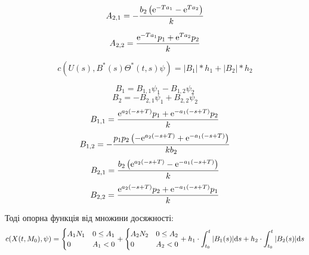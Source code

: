 \documentclass{article}
\begin{document}
\begin{equation}
A_{{2,1}}=-{\frac {b_{{2}} \left( {{\rm e}^{-Ta_{{1}}}}-{{\rm e}^{Ta_{
{2}}}} \right) }{k}}
\end{equation}

\begin{equation}
A_{{2,2}}={\frac {{{\rm e}^{-Ta_{{1}}}}p_{{1}}+{{\rm e}^{Ta_{{2}}}}p_{
{2}}}{k}}
\end{equation}

\begin{equation}
c( U(s), B^*(s) \Theta^* (t, s) \psi)=|B_1|*h_1+|B_2|*h_2
\end{equation}

\begin{equation}
B_{{1}}=B_{{1,1}}\psi_{{1}}-B_{{1,2}}\psi_{{2}}
\end{equation}
\begin{equation}
B_{{2}}=-B_{{2,1}}\psi_{{1}}+B_{{2,2}}\psi_{{2}}
\end{equation}
\begin{equation}
B_{{1,1}}={\frac {{{\rm e}^{a_{{2}} \left( -s+T \right) }}p_{{1}}+{
{\rm e}^{-a_{{1}} \left( -s+T \right) }}p_{{2}}}{k}}
\end{equation}
\begin{equation}
B_{{1,2}}=-{\frac {p_{{1}}p_{{2}} \left( -{{\rm e}^{a_{{2}} \left( -s+
T \right) }}+{{\rm e}^{-a_{{1}} \left( -s+T \right) }} \right) }{kb_{{
2}}}}
\end{equation}
\begin{equation}
B_{{2,1}}={\frac {b_{{2}} \left( {{\rm e}^{a_{{2}} \left( -s+T
 \right) }}-{{\rm e}^{-a_{{1}} \left( -s+T \right) }} \right) }{k}}
\end{equation}
\begin{equation}
B_{{2,2}}={\frac {{{\rm e}^{a_{{2}} \left( -s+T \right) }}p_{{2}}+{
{\rm e}^{-a_{{1}} \left( -s+T \right) }}p_{{1}}}{k}}
\end{equation}

Тоді опорна функція від множини досяжності:
\begin{equation}
c(X(t, M_0) , \psi) =
\begin{cases}
A_{{1}}N_{{1}}&0\leq A_{{1}}\cr 0&A_{{1}}<0\cr
\end{cases}
+
\begin{cases}
A_{{2}}N_{{2}}&0\leq A_{{2}}\cr 0&A_{{2}}<0\cr
\end{cases}
+h_1\cdot\int_{t_0}^t |B_1(s)|\mathrm{d}s +h_2\cdot\int_{t_0}^t|B_2(s)| \mathrm{d}s
\end{equation}
\end{document}
